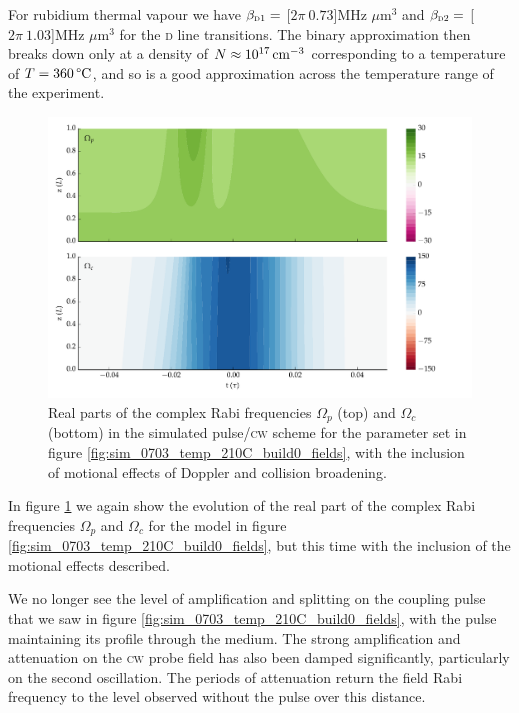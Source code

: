    For rubidium thermal vapour we have $\beta_{\textsc{d1}} = $
    \unit[$2\pi~0.73$]{MHz $\mu$m$^3$}  and $\beta_{\textsc{d2}} = $
    \unit[$2\pi~1.03$]{MHz $\mu$m$^3$} for the \textsc{d} line
    transitions.\cite{Weller2011} The binary approximation then breaks down only
    at a density of $N \approx \unit[10^{17}]{cm^{-3}}$ corresponding to a
    temperature of $T = \unit[360]{\textrm{\textdegree C}}$, and so is a good
    approximation across the temperature range of the experiment.

    \begin{figure}[h]
      \includegraphics[width=\linewidth]{figs/06_simultons/mb_vee2g_build1_15c_130p_0330t_230C_sb50_120vel000_00_002um_fig2.pdf}
      \caption{Real parts of the complex Rabi frequencies $\Omega_{p}$ (top) and 
      $\Omega_{c}$ (bottom) in the simulated pulse/\textsc{cw} scheme for the parameter set in figure \ref{fig:sim_0703_temp_210C_build0_fields}, with the inclusion of motional effects of Doppler and collision broadening.}
      \label{fig:sim_0703_temp_210C_build2_fields}
    \end{figure}

    In figure \ref{fig:sim_0703_temp_210C_build2_fields} we again show the
    evolution of the real part of the complex Rabi frequencies $\Omega_p$ and
    $\Omega_c$ for the model in figure
    \ref{fig:sim_0703_temp_210C_build0_fields}, but this time with the inclusion
    of the motional effects described. 

    We no longer see the level of amplification and splitting on the coupling
    pulse that we saw in figure \ref{fig:sim_0703_temp_210C_build0_fields}, with
    the pulse maintaining its profile through the medium. The strong
    amplification and attenuation on the \textsc{cw} probe field has also been
    damped significantly, particularly on the second oscillation. The periods of
    attenuation return the field Rabi frequency to the level observed without
    the pulse over this distance.


